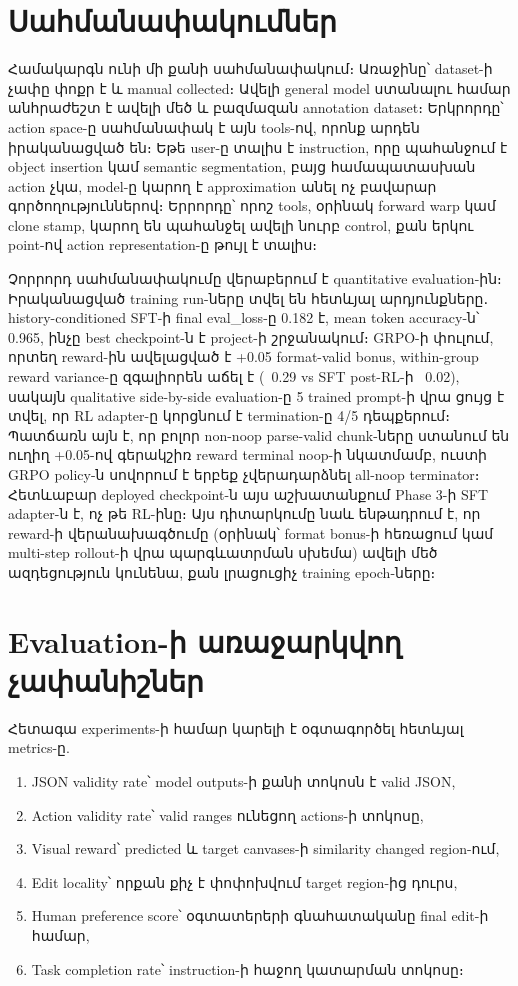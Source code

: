 \documentclass[12pt,a4paper]{report}
\newcommand{\Eng}[1]{\textenglish{#1}}
\begin{document}
\section{Սահմանափակումներ}

Համակարգն ունի մի քանի սահմանափակում։ Առաջինը՝ dataset-ի չափը փոքր է և manual collected։ Ավելի general model ստանալու համար անհրաժեշտ է ավելի մեծ և բազմազան annotation dataset։ Երկրորդը՝ action space-ը սահմանափակ է այն tools-ով, որոնք արդեն իրականացված են։ Եթե user-ը տալիս է instruction, որը պահանջում է object insertion կամ semantic segmentation, բայց համապատասխան action չկա, model-ը կարող է approximation անել ոչ բավարար գործողություններով։ Երրորդը՝ որոշ tools, օրինակ forward warp կամ clone stamp, կարող են պահանջել ավելի նուրբ control, քան երկու point-ով action representation-ը թույլ է տալիս։

Չորրորդ սահմանափակումը վերաբերում է quantitative evaluation-ին։ Իրականացված training run-ները տվել են հետևյալ արդյունքները․ history-conditioned SFT-ի final \Eng{eval\_loss}-ը 0.182 է, mean token accuracy-ն՝ 0.965, ինչը best checkpoint-ն է project-ի շրջանակում։ GRPO-ի փուլում, որտեղ reward-ին ավելացված է \Eng{+0.05} format-valid bonus, within-group reward variance-ը զգալիորեն աճել է (~0.29 vs SFT post-RL-ի ~0.02), սակայն qualitative side-by-side evaluation-ը 5 trained prompt-ի վրա ցույց է տվել, որ RL adapter-ը կորցնում է termination-ը 4/5 դեպքերում։ Պատճառն այն է, որ բոլոր non-noop parse-valid chunk-ները ստանում են ուղիղ \Eng{+0.05}-ով գերակշիռ reward terminal noop-ի նկատմամբ, ուստի GRPO policy-ն սովորում է երբեք չվերադարձնել all-noop terminator։ Հետևաբար deployed checkpoint-ն այս աշխատանքում Phase 3-ի SFT adapter-ն է, ոչ թե RL-ինը։ Այս դիտարկումը նաև ենթադրում է, որ reward-ի վերանախագծումը (օրինակ՝ format bonus-ի հեռացում կամ multi-step rollout-ի վրա պարգևատրման սխեմա) ավելի մեծ ազդեցություն կունենա, քան լրացուցիչ training epoch-ները։

\section{Evaluation-ի առաջարկվող չափանիշներ}

Հետագա experiments-ի համար կարելի է օգտագործել հետևյալ metrics-ը.
\begin{enumerate}
    \item \Eng{JSON validity rate}՝ model outputs-ի քանի տոկոսն է valid JSON,
    \item \Eng{Action validity rate}՝ valid ranges ունեցող actions-ի տոկոսը,
    \item \Eng{Visual reward}՝ predicted և target canvases-ի similarity changed region-ում,
    \item \Eng{Edit locality}՝ որքան քիչ է փոփոխվում target region-ից դուրս,
    \item \Eng{Human preference score}՝ օգտատերերի գնահատականը final edit-ի համար,
    \item \Eng{Task completion rate}՝ instruction-ի հաջող կատարման տոկոսը։
\end{enumerate}
\end{document}
